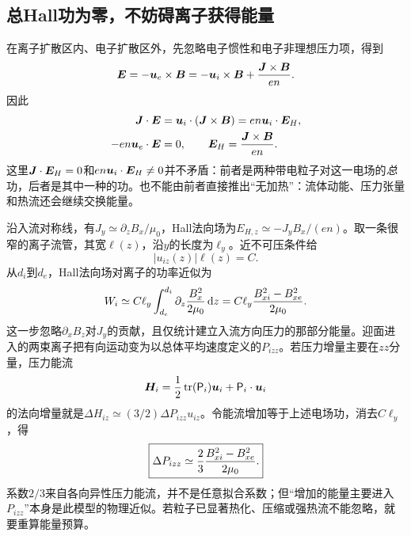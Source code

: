 \documentclass[UTF8,a4paper,11pt,openany,fontset=fandol]{ctexbook}
\begin{document}
\subsection{总Hall功为零，不妨碍离子获得能量}
在离子扩散区内、电子扩散区外，先忽略电子惯性和电子非理想压力项，得到
\begin{equation}
 \bm{E}=-\bm{u}_e\times\bm{B}=-\bm{u}_i\times\bm{B}+{\bm{J}\times\bm{B}\over en}.
\end{equation}
因此
\begin{align}
 \bm{J}\cdot\bm{E}&=\bm{u}_i\cdot(\bm{J}\times\bm{B})
             =en\bm{u}_i\cdot\bm{E}_H,\\
 -en\bm{u}_e\cdot\bm{E}&=0,
 \qquad \bm{E}_H={\bm{J}\times\bm{B}\over en}.
\end{align}
这里$\bm{J}\cdot\bm{E}_H=0$和$en\bm{u}_i\cdot\bm{E}_H\ne0$并不矛盾：前者是两种带电粒子对这一电场的\emph{总}功，后者是其中一种的功。也不能由前者直接推出“无加热”：流体动能、压力张量和热流还会继续交换能量。

沿入流对称线，有$J_y\simeq\partial_zB_x/\mu_0$，Hall法向场为$E_{H,z}\simeq-J_yB_x/(en)$。取一条很窄的离子流管，其宽$\ell(z)$，沿$y$的长度为$\ell_y$。近不可压条件给
\begin{equation}
 |u_{iz}(z)|\ell(z)=C.
\end{equation}
从$d_i$到$d_e$，Hall法向场对离子的功率近似为
\begin{equation}
 W_i\simeq C\ell_y\int_{d_e}^{d_i}\partial_z{B_x^2\over2\mu_0}\,\mathrm d z
 =C\ell_y{B_{xi}^2-B_{xe}^2\over2\mu_0}.
\end{equation}
这一步忽略$\partial_xB_z$对$J_y$的贡献，且仅统计建立入流方向压力的那部分能量。迎面进入的两束离子把有向运动变为以总体平均速度定义的$P_{izz}$。若压力增量主要在$zz$分量，压力能流
\begin{equation}
 \bm{H}_i={1\over2}\operatorname{tr}(\mathsf P_i)\bm{u}_i+\mathsf P_i\cdot\bm{u}_i
\end{equation}
的法向增量就是$\Delta H_{iz}\simeq(3/2)\Delta P_{izz}u_{iz}$。令能流增加等于上述电场功，消去$C\ell_y$，得
\begin{equation}
 \boxed{\Delta P_{izz}\simeq{2\over3}{B_{xi}^2-B_{xe}^2\over2\mu_0}.}
 \label{eq:remaining-pressure}
\end{equation}
系数$2/3$来自各向异性压力能流，并不是任意拟合系数；但“增加的能量主要进入$P_{izz}$”本身是此模型的物理近似。若粒子已显著热化、压缩或强热流不能忽略，就要重算能量预算。
\end{document}
